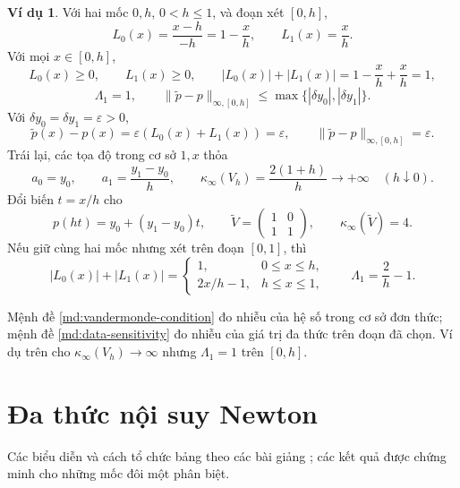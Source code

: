 \documentclass[12pt,a4paper,oneside]{book}
\numberwithin{algorithm}{chapter}
\theoremstyle{definition}
\newtheorem{vidu}{Ví dụ}[chapter]
\begin{document}
\begin{vidu}
Với hai mốc $0,h$, $0<h\leq1$, và đoạn xét $[0,h]$,
\[
 L_0(x)=\frac{x-h}{-h}=1-\frac{x}{h},\qquad
 L_1(x)=\frac{x}{h}.
\]
Với mọi $x\in[0,h]$,
\[
 L_0(x)\geq0,\qquad L_1(x)\geq0,
 \qquad|L_0(x)|+|L_1(x)|=1-\frac{x}{h}+\frac{x}{h}=1,
\]
\[
 \Lambda_1=1,\qquad
 \|\widetilde p-p\|_{\infty,[0,h]}
 \leq\max\{|\delta y_0|,|\delta y_1|\}.
\]
Với $\delta y_0=\delta y_1=\varepsilon>0$,
\[
 \widetilde p(x)-p(x)=\varepsilon(L_0(x)+L_1(x))=\varepsilon,
 \qquad
 \|\widetilde p-p\|_{\infty,[0,h]}=\varepsilon.
\]
Trái lại, các tọa độ trong cơ sở $1,x$ thỏa
\[
 a_0=y_0,\qquad a_1=\frac{y_1-y_0}{h},\qquad
 \kappa_\infty(V_h)=\frac{2(1+h)}h\longrightarrow+\infty\quad(h\downarrow0).
\]
Đổi biến $t=x/h$ cho
\[
 p(ht)=y_0+(y_1-y_0)t,\qquad
 \widetilde V=\begin{pmatrix}1&0\\1&1\end{pmatrix},\qquad
 \kappa_\infty(\widetilde V)=4.
\]
Nếu giữ cùng hai mốc nhưng xét trên đoạn $[0,1]$, thì
\[
 |L_0(x)|+|L_1(x)|=
 \begin{cases}
 1,&0\leq x\leq h,\\
 2x/h-1,&h\leq x\leq1,
 \end{cases}
 \qquad
 \Lambda_1=\frac2h-1.
\]
\end{vidu}

Mệnh đề \ref{md:vandermonde-condition} đo nhiễu của hệ số trong cơ sở đơn thức; mệnh đề \ref{md:data-sensitivity} đo nhiễu của giá trị đa thức trên đoạn đã chọn. Ví dụ trên cho $\kappa_\infty(V_h)\to\infty$ nhưng $\Lambda_1=1$ trên $[0,h]$.

\section{Đa thức nội suy Newton}
Các biểu diễn và cách tổ chức bảng theo các bài giảng \cite{newton-slides,newton-slides-2022}; các kết quả được chứng minh cho những mốc đôi một phân biệt.
\end{document}
